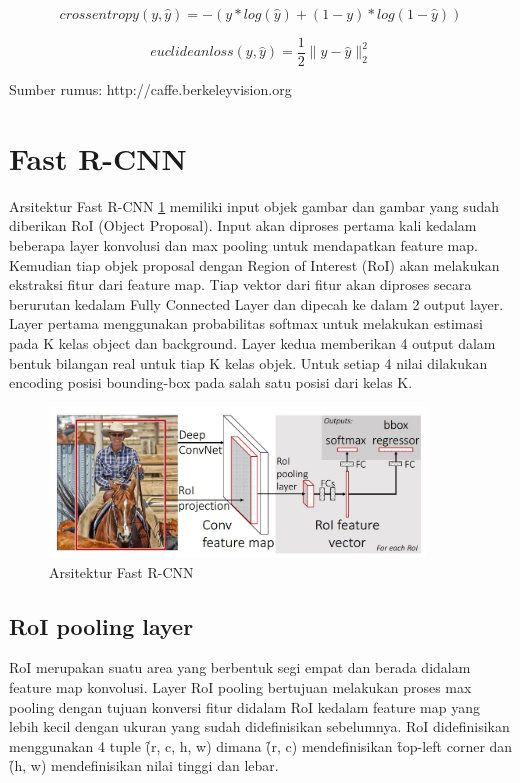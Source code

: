 \begin{equation}
\label{equ:cl}
crossentropy(y, \hat{y}) = -(y * log(\hat{y}) + (1 - y) * log(1 - \hat{y}))
\end{equation}

\begin{equation}
\label{equ:el}
euclideanloss(y, \hat{y}) = \frac{1}{2} \|y - \hat{y}\|^{2}_{2}
\end{equation}
\begin{center}
	{\small Sumber rumus: http://caffe.berkeleyvision.org}
\end{center}
\section{Fast R-CNN}

Arsitektur Fast R-CNN \ref{fig:arsitektur_fcnn} memiliki input objek gambar dan gambar yang sudah diberikan RoI (Object Proposal). Input akan diproses pertama kali kedalam beberapa layer konvolusi dan max pooling untuk mendapatkan feature map. Kemudian tiap objek proposal dengan Region of Interest (RoI) akan melakukan ekstraksi fitur dari feature map. Tiap vektor dari fitur akan diproses secara berurutan kedalam Fully Connected Layer dan dipecah ke dalam 2 output layer. Layer pertama menggunakan probabilitas softmax untuk melakukan estimasi pada K kelas object dan background. Layer kedua memberikan 4 output dalam bentuk bilangan real untuk tiap K kelas objek. Untuk setiap 4 nilai dilakukan encoding posisi bounding-box pada salah satu posisi dari kelas K.

\begin{figure}[htp]
	\centering
	\includegraphics[width=10cm]{pics/arsitektur_fcnn}
	\caption{Arsitektur Fast R-CNN}
	\label{fig:arsitektur_fcnn}
\end{figure}

\subsection{RoI pooling layer}
RoI merupakan suatu area yang berbentuk segi empat dan berada didalam feature map konvolusi. Layer RoI pooling bertujuan melakukan proses max pooling dengan tujuan konversi fitur didalam RoI kedalam feature map yang lebih kecil dengan ukuran yang sudah didefinisikan sebelumnya. RoI didefinisikan menggunakan 4 tuple \f{(r, c, h, w)} dimana \f{(r, c)} mendefinisikan \f{top-left corner} dan \f{(h, w)} mendefinisikan nilai tinggi dan lebar.

